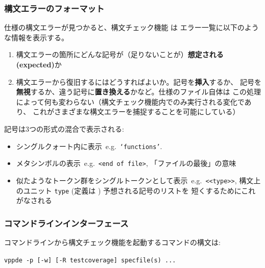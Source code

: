 \documentclass[\pformat,12pt]{jarticle}
\newcommand{\vdmde}{vppde}
\newcommand{\guicmd}[1]{{\gt #1}}
\begin{document}
\subsubsection{構文エラーのフォーマット} \label{subsub:synerr}


仕様の構文エラーが見つかると、構文チェック機能 は
\guicmd{エラー一覧}に以下のような情報を表示する。

\begin{enumerate}


\item
 構文エラーの箇所にどんな記号が（足りないことが）\textbf{想定される(expected)}か

\item
  構文エラーから復旧するにはどうすればよいか。記号を\textbf{挿入}するか、
  記号を\textbf{無視}するか、違う記号に\textbf{置き換える}かなど。仕様のファイル自体は
  この処理によって何も変わらない（構文チェック機能内でのみ実行される変化であり、
  これがさまざまな構文エラーを捕捉することを可能にしている）

\end{enumerate}

記号は3つの形式の混合で表示される:

\begin{itemize}

\item
     シングルクォート内に表示~e.g.\ {\tt `functions'}.

\item
  メタシンボルの表示~e.g.\ \verb!<end of file>!, 「ファイルの最後」の意味

\item
  似たようなトークン群をシングルトークンとして表示~e.g.\ 
  \verb!<<type>>!, 構文上のユニット {\tt type} (定義は
  ) 予想される記号のリストを
  短くするためにこれがなされる
\end{itemize}

\subsubsection{コマンドラインインターフェース}\label{subsec:parcom}

コマンドラインから構文チェック機能を起動するコマンドの構文は:

{\tt \vdmde\ -p [-w] [-R testcoverage] specfile(s) ...}
\end{document}
